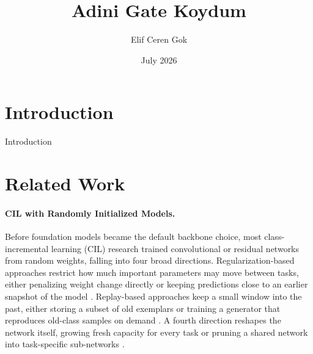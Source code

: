 \documentclass{article}
\title{Adini Gate Koydum}
\author{Elif Ceren Gok}
\date{July 2026}
\begin{document}
\maketitle

\section{Introduction}

Introduction

\section{Related Work}
\label{sec:related-work}

\paragraph{CIL with Randomly Initialized Models.}
Before foundation models became the default backbone choice, most
class-incremental learning (CIL) research trained convolutional or residual
networks \citep{he2016deep} from random weights, falling into four broad
directions. Regularization-based approaches restrict how much important
parameters may move between tasks, either penalizing weight change directly
\citep{kirkpatrick2017overcoming,zenke2017continual} or keeping predictions
close to an earlier snapshot of the model
\citep{li2018learning,aljundi2018memory}. Replay-based approaches keep a
small window into the past, either storing a subset of old exemplars
\citep{rebuffi2017icarl,lopezpaz2017gradient,bang2021rainbow,prabhu2020gdumb,wu2019large,zhao2020maintaining,liu2021rmm,arani2022learning,sarfraz2023error}
or training a generator that reproduces old-class samples on demand
\citep{shin2017continual,he2018exemplarsupported,hu2019overcoming,petit2023fetril,mocanu2016online}.
A fourth direction reshapes the network itself, growing fresh capacity for
every task
\citep{aljundi2017expert,yan2021der,wang2022foster,wang2023task,zhou2023model}
or pruning a shared network into task-specific sub-networks
\citep{mallya2018packnet,wortsman2020supermasks,kang2022forgetfree,kang2023soft,golkar2019continual,wang2022sparcl,yildirim2024continual,yildirim2025selfregulated}.
\end{document}

